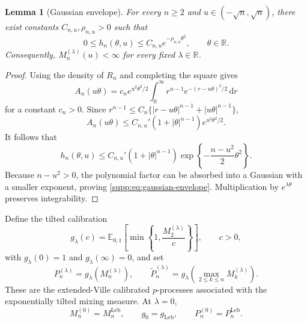 \documentclass[numsec,webpdf,modern,medium,namedate]{oup-authoring-template}
\theoremstyle{thmstyleone}
\newtheorem{lemma}[theorem]{Lemma}
\theoremstyle{thmstyletwo}
\newcommand{\R}{\mathbb{R}}
\newcommand{\E}{\mathbb{E}}
\newcommand{\dd}{\mathrm{d}}
\newcommand{\Leb}{\mathrm{Leb}}
\begin{document}
\begin{lemma}[Gaussian envelope]
\label{supp:lem:gaussian-envelope}
For every $n\geq2$ and $u\in(-\sqrt n,\sqrt n)$, there exist constants
$C_{n,u},\rho_{n,u}>0$ such that
\begin{equation}
\label{supp:eq:gaussian-envelope}
  0\leq h_n(\theta,u)
  \leq C_{n,u}e^{-\rho_{n,u}\theta^2},
  \qquad \theta\in\R.
\end{equation}
Consequently, $M_n^{(\lambda)}(u)<\infty$ for every fixed
$\lambda\in\R$.
\end{lemma}

\begin{proof}
Using the density of $R_n$ and completing the square gives
\[
  A_n(u\theta)
  =
  c_n e^{u^2\theta^2/2}
  \int_0^\infty
    r^{n-1}e^{-(r-u\theta)^2/2}\,\dd r
\]
for a constant $c_n>0$.  Since
$r^{n-1}\leq C_n\{ |r-u\theta|^{n-1}+|u\theta|^{n-1}\}$,
\[
  A_n(u\theta)
  \leq
  C_{n,u}'(1+|\theta|^{n-1})e^{u^2\theta^2/2}.
\]
It follows that
\[
  h_n(\theta,u)
  \leq
  C_{n,u}'(1+|\theta|^{n-1})
  \exp\left\{-\frac{n-u^2}{2}\theta^2\right\}.
\]
Because $n-u^2>0$, the polynomial factor can be absorbed into a
Gaussian with a smaller exponent, proving
\eqref{supp:eq:gaussian-envelope}.  Multiplication by
$e^{\lambda\theta}$ preserves integrability.
\end{proof}

Define the tilted calibration
\begin{equation}
\label{supp:eq:tilted-calibration}
  g_\lambda(c)
  =
  \E_{0,1}\left[
    \min\left\{1,\frac{M_2^{(\lambda)}}{c}\right\}
  \right],
  \qquad c>0,
\end{equation}
with $g_\lambda(0)=1$ and $g_\lambda(\infty)=0$, and set
\begin{equation}
\label{supp:eq:tilted-p-processes}
  P_n^{(\lambda)}
  =
  g_\lambda\left(M_n^{(\lambda)}\right),
  \qquad
  \widetilde P_n^{(\lambda)}
  =
  g_\lambda\left(
    \max_{2\leq k\leq n}M_k^{(\lambda)}
  \right).
\end{equation}
These are the extended-Ville calibrated $p$-processes associated with
the exponentially tilted mixing measure.  At $\lambda=0$,
\begin{equation}
\label{supp:eq:lambda-zero}
  M_n^{(0)}=M_n^{\Leb},
  \qquad
  g_0=g_{\Leb},
  \qquad
  P_n^{(0)}=P_n^{\Leb}.
\end{equation}
\end{document}

